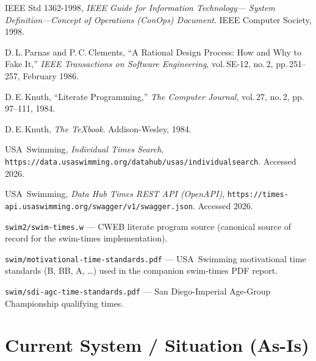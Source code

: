 \documentclass[12pt]{article}
\newcommand{\code}[1]{\texttt{#1}}
\begin{document}
\begin{enumerate}[label={[\arabic*]}]
  \item IEEE Std 1362-1998, \textit{IEEE Guide for Information Technology---
        System Definition---Concept of Operations (ConOps) Document}.
        IEEE Computer Society, 1998.

  \item D.\,L.\,Parnas and P.\,C.\,Clements, ``A Rational Design Process:
        How and Why to Fake It,''
        \textit{IEEE Transactions on Software Engineering},
        vol.\,SE-12, no.\,2, pp.\,251--257, February 1986.

  \item D.\,E.\,Knuth, ``Literate Programming,''
        \textit{The Computer Journal}, vol.\,27, no.\,2,
        pp.\,97--111, 1984.

  \item D.\,E.\,Knuth, \textit{The \TeX{}book}.
        Addison-Wesley, 1984.

  \item USA~Swimming, \textit{Individual Times Search},
        \texttt{https://data.usaswimming.org/datahub/usas/individualsearch}.
        Accessed 2026.

  \item USA~Swimming, \textit{Data Hub Times REST API (OpenAPI)},
        \texttt{https://times-api.usaswimming.org/swagger/v1/swagger.json}.
        Accessed 2026.

  \item \code{swim2/swim-times.w} --- CWEB literate program source
        (canonical source of record for the swim-times implementation).

  \item \code{swim/motivational-time-standards.pdf} --- USA~Swimming
        motivational time standards (B, BB, A, \ldots) used in
        the companion swim-times PDF report.

  \item \code{swim/sdi-agc-time-standards.pdf} --- San Diego-Imperial
        Age-Group Championship qualifying times.
\end{enumerate}

\section{Current System / Situation (As-Is)}
\end{document}
